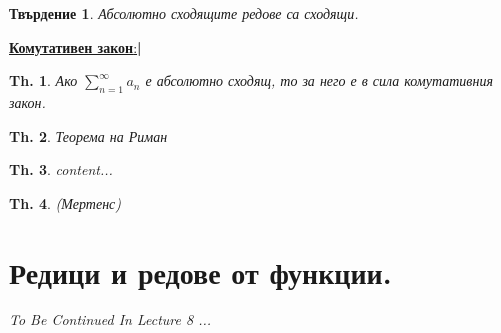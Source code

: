 \documentclass[12pt]{article}
\newcommand{\halfbox}[1]{\underline{\textbf{#1}:}\textbf{\large{| }}}
\newtheorem{proposition}{Твърдение}
\newtheorem{theorem}{Th.}
\begin{document}
	\begin{proposition}
		Абсолютно сходящите редове са сходящи.
	\end{proposition}

	\halfbox{Комутативен закон}
	
	\begin{theorem}
		Ако $\sum_{n=1}^{\infty}a_n$ е абсолютно сходящ, то за него е в сила комутативния закон.
	\end{theorem}
	
	\begin{theorem}
		Теорема на Риман\\
		
	\end{theorem}
	
	\begin{theorem}
		content...
	\end{theorem}

	\begin{theorem}
		(Мертенс)\\
	\end{theorem}

	\section*{Редици и редове от функции.}
	\textit{To Be Continued In Lecture 8 ...}
\end{document}
